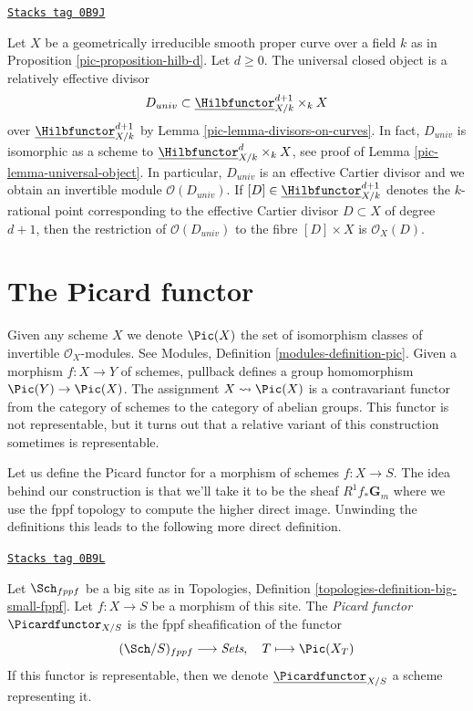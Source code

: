 \begin{remark}
\label{pic-remark-universal-object-hilb-d}
\href{https://stacks.math.columbia.edu/tag/0B9J}{\texttt{Stacks tag 0B9J}}

Let $X$ be a geometrically irreducible smooth proper curve over a field $k$
as in Proposition \ref{pic-proposition-hilb-d}. Let $d \geq 0$. The universal
closed object is a relatively effective divisor
$$
D_{univ} \subset \underline{\Hilbfunctor}^{d + 1}_{X/k} \times_k X
$$
over $\underline{\Hilbfunctor}^{d + 1}_{X/k}$ by
Lemma \ref{pic-lemma-divisors-on-curves}.
In fact, $D_{univ}$ is isomorphic as a scheme to
$\underline{\Hilbfunctor}^d_{X/k} \times_k X$, see proof of
Lemma \ref{pic-lemma-universal-object}.
In particular, $D_{univ}$ is an effective Cartier divisor and
we obtain an invertible module
$\mathcal{O}(D_{univ})$. If $[D] \in \underline{\Hilbfunctor}^{d + 1}_{X/k}$
denotes the $k$-rational point corresponding to the effective
Cartier divisor $D \subset X$ of degree $d + 1$, then the restriction
of $\mathcal{O}(D_{univ})$ to the fibre $[D] \times X$ is
$\mathcal{O}_X(D)$.
\end{remark}

\section{The Picard functor}
\label{pic-section-picard-functor}
Given any scheme $X$ we denote $\Pic(X)$ the set of isomorphism
classes of invertible $\mathcal{O}_X$-modules.
See Modules, Definition \ref{modules-definition-pic}.
Given a morphism $f : X \to Y$ of schemes, pullback defines
a group homomorphism $\Pic(Y) \to \Pic(X)$.
The assignment
$X \leadsto \Pic(X)$ is a contravariant functor from the category
of schemes to the category of abelian groups. This functor is not
representable, but it turns out that a relative variant of this
construction sometimes is representable.

\medskip\noindent
Let us define the Picard functor for a morphism of schemes $f : X \to S$.
The idea behind our construction is that we'll take it to be the sheaf
$R^1f_*\mathbf{G}_m$ where we use the fppf topology to compute the higher
direct image. Unwinding the definitions this leads to the following more
direct definition.

\begin{definition}
\label{pic-definition-picard-functor}
\href{https://stacks.math.columbia.edu/tag/0B9L}{\texttt{Stacks tag 0B9L}}

Let $\Sch_{fppf}$ be a big site as in
Topologies, Definition \ref{topologies-definition-big-small-fppf}.
Let $f : X \to S$ be a morphism of this site. The {\it Picard functor}
$\Picardfunctor_{X/S}$ is the fppf sheafification of the functor
$$
(\Sch/S)_{fppf} \longrightarrow \textit{Sets},\quad
T \longmapsto \Pic(X_T)
$$
If this functor is representable, then we denote
$\underline{\Picardfunctor}_{X/S}$ a scheme representing it.
\end{definition}

